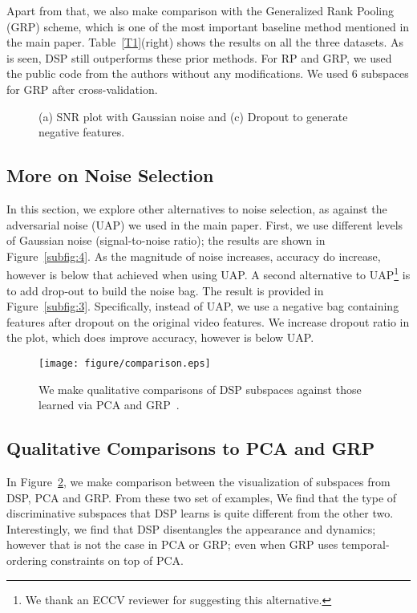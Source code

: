\documentclass[runningheads]{llncs}
\begin{document}
Apart from that, we also make comparison with the Generalized Rank Pooling (GRP) scheme\cite{grp}, which is one of the most important baseline method mentioned in the main paper. Table~\ref{T1}(right) shows the results on all the three datasets. As is seen, DSP still outperforms these prior methods. For RP and GRP, we used the public code from the authors without any modifications. We used 6 subspaces for GRP after cross-validation.



\begin{figure}[!h]
	\begin{center}
	\end{center}
	\caption{(a) SNR plot with Gaussian noise and (c) Dropout to generate negative features.}
	\label{fig:all_plots}
\end{figure}
\subsection{More on Noise Selection}
In this section, we explore other alternatives to noise selection, as against the adversarial noise (UAP) we used in the main paper. First, we use different levels of Gaussian noise (signal-to-noise ratio); the results are shown in Figure~\ref{subfig:4}. As the magnitude of noise increases, accuracy do increase, however is below that achieved when using UAP. A second alternative to UAP\footnote{We thank an ECCV reviewer for suggesting this alternative.} is to add drop-out to build the noise bag. The result is provided in Figure~\ref{subfig:3}. Specifically, instead of UAP, we use a negative bag containing features after dropout on the original video features. We increase dropout ratio in the plot, which does improve accuracy, however is below UAP. 



\begin{figure}[]
\begin{center}
	\texttt{[image: figure/comparison.eps]}
\end{center}
\caption{We make qualitative comparisons of DSP subspaces against those learned via PCA and GRP~\cite{grp}.}
\label{comparison}
\end{figure}
\subsection{Qualitative Comparisons to PCA and GRP}
In Figure~\ref{comparison}, we make comparison between the visualization of subspaces from DSP, PCA and GRP. From these two set of examples, We find that the type of discriminative subspaces that DSP learns is quite different from the other two. Interestingly, we find that DSP disentangles the appearance and dynamics; however that is not the case in PCA or GRP; even when GRP uses temporal-ordering constraints on top of PCA. 


 
\end{document}
